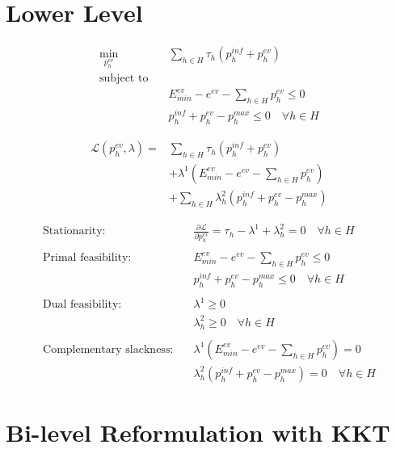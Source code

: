 \section{Lower Level}

\begin{align*}
\min_{p^{ev}_h} \quad & \sum_{h\in H} \tau_h(p^{inf}_{h} + p^{ev}_{h})\\
\text{subject to} \quad&\\
&  E^{ev}_{min} - e^{ev} -\sum_{h\in H} p^{ev}_{h}\leq 0\\
& p^{inf}_{h} + p^{ev}_{h} - p^{max}_{h}\leq 0 \quad \forall h \in H
\end{align*}


 \begin{align*}
\mathcal{L}(p^{ev}_h, \lambda) = 
&\sum_{h \in H} \tau_h(p^{inf}_h + p^{ev}_h) \\
&+ \lambda^1 \left( E^{ev}_{min} - e^{ev} - \sum_{h \in H} p^{ev}_h \right) \\
&+ \sum_{h \in H} \lambda^2_h \left( p^{inf}_h + p^{ev}_h - p^{max}_h \right)
\end{align*}

\begin{align*}
\text{Stationarity:} \quad
& \frac{\partial \mathcal{L}}{\partial p^{ev}_h} = \tau_h - \lambda^1 + \lambda^2_h = 0 \quad \forall h \in H \\
\\
\text{Primal feasibility:} \quad
& E^{ev}_{min} - e^{ev} - \sum_{h \in H} p^{ev}_h \leq 0 \\
& p^{inf}_h + p^{ev}_h - p^{max}_h \leq 0 \quad \forall h \in H\\ \\
\text{Dual feasibility:} \quad
& \lambda^1 \geq 0 \\
& \lambda^2_h \geq 0 \quad \forall h \in H \\\\
\text{Complementary slackness:} \quad
& \lambda^1 \left( E^{ev}_{min} - e^{ev} - \sum_{h \in H} p^{ev}_h \right) = 0 \\
& \lambda^2_h \left( p^{inf}_h + p^{ev}_h - p^{max}_h \right) = 0 \quad \forall h \in H
\end{align*}

\newpage
\section{Bi-level Reformulation with KKT}

